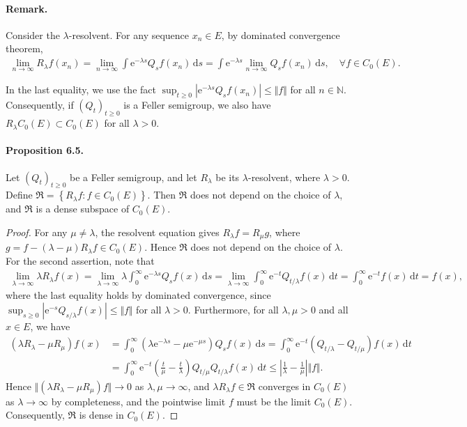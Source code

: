 \documentclass{article}
\numberwithin{equation}{section}
\newcommand{\e}{\mathrm{e}}
\renewcommand{\d}{\mathrm{d}}
\theoremstyle{plain}
\theoremstyle{definition}
\begin{document}
\paragraph{Remark.} Consider the $\lambda$-resolvent. For any sequence $x_n\in E$, by dominated convergence theorem,
\begin{align*}
	\lim_{n\to\infty}R_\lambda f(x_n) = \lim_{n\to\infty}\int\e^{-\lambda s}Q_sf(x_n)\,\d s=\int\e^{-\lambda s}\lim_{n\to\infty}Q_sf(x_n)\,\d s,\quad\forall f\in C_0(E).
\end{align*}

In the last equality, we use the fact $\sup_{t\geq 0}\left\vert\e^{-\lambda s}Q_{s}f(x_n)\right\vert\leq\Vert f\Vert$ for all $n\in\mathbb{N}$. Consequently, if $(Q_t)_{t\geq 0}$ is a Feller semigroup, we also have $R_\lambda C_0(E)\subset C_0(E)$ for all $\lambda>0$.

\paragraph{Proposition 6.5.\label{prop:6.5}} Let $(Q_t)_{t\geq 0}$ be a Feller semigroup, and let $R_\lambda$ be its $\lambda$-resolvent, where $\lambda>0$. Define $\mathfrak{R}=\left\{R_\lambda f:f\in C_0(E)\right\}$. Then $\mathfrak{R}$ does not depend on the choice of $\lambda$, and $\mathfrak{R}$ is a dense subspace of $C_0(E)$.
\begin{proof}
For any $\mu\neq\lambda$, the resolvent equation gives $R_\lambda f=R_\mu g$, where $g=f-(\lambda-\mu)R_\lambda f\in C_0(E)$. Hence $\mathfrak{R}$ does not depend on the choice of $\lambda$. For the second assertion, note that
\begin{align*}
	\lim_{\lambda\to\infty}\lambda R_\lambda f(x) = \lim_{\lambda\to\infty}\lambda\int_0^\infty\e^{-\lambda s} Q_sf(x)\,\d s = \lim_{\lambda\to\infty}\int_0^\infty \e^{-t}Q_{t/\lambda}f(x)\,\d t = \int_0^\infty\e^{-t}f(x)\,\d t = f(x),
\end{align*}
where the last equality holds by dominated convergence, since $\sup_{s\geq 0}\left\vert\e^{-s}Q_{s/\lambda}f(x)\right\vert\leq\Vert f\Vert$ for all $\lambda>0$. Furthermore, for all $\lambda,\mu>0$ and all $x\in E$, we have
\begin{align*}
	(\lambda R_\lambda-\mu R_\mu) f(x) &= \int_0^\infty\left(\lambda\e^{-\lambda s}-\mu\e^{-\mu s}\right) Q_sf(x)\,\d s = \int_0^\infty\e^{-t}\left(Q_{t/\lambda}-Q_{t/\mu}\right)f(x)\,\d t\\
	&=\int_0^\infty\e^{-t}\left(\frac{t}{\mu}-\frac{t}{\lambda}\right)Q_{t/\mu}Q_{t/\lambda}f(x)\,\d t\leq\left\vert\frac{1}{\lambda}-\frac{1}{\mu}\right\vert\Vert f\Vert.
\end{align*}
Hence $\Vert(\lambda R_\lambda-\mu R_\mu)f\Vert\to 0$ as $\lambda,\mu\to\infty$, and $\lambda R_\lambda f\in\mathfrak{R}$ converges in $C_0(E)$ as $\lambda\to\infty$ by completeness, and the pointwise limit $f$ must be the limit $C_0(E)$. Consequently, $\mathfrak{R}$ is dense in $C_0(E)$.
\end{proof}
\end{document}
